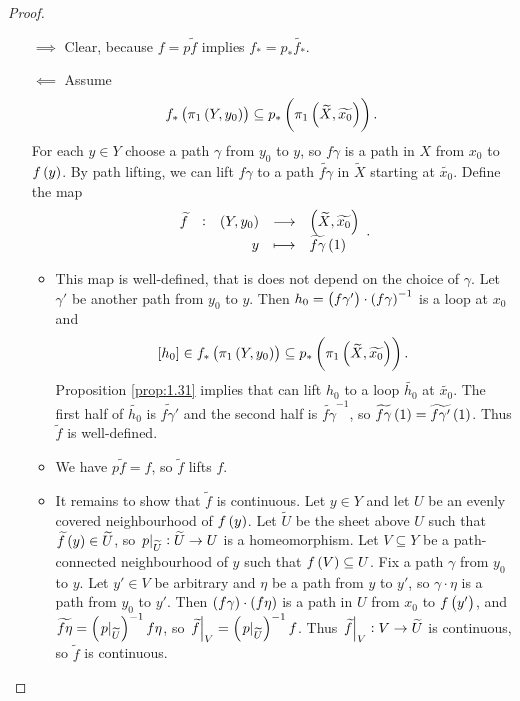 \begin{proof}
\hfill
\begin{itemize}
\item[$ \implies $] Clear, because $ f = p\widetilde{f} $ implies $ f_* = p_*\widetilde{f_*} $.
\item[$ \impliedby $] Assume
$$ f_*\br{\pi_1\br{Y, y_0}} \subseteq p_*\br{\pi_1\br{\widetilde{X}, \widetilde{x_0}}}. $$
For each $ y \in Y $ choose a path $ \gamma $ from $ y_0 $ to $ y $, so $ f\gamma $ is a path in $ X $ from $ x_0 $ to $ f\br{y} $. By path lifting, we can lift $ f\gamma $ to a path $ \widetilde{f\gamma} $ in $ \widetilde{X} $ starting at $ \widetilde{x_0} $. Define the map
$$ \function[\widetilde{f}]{\br{Y, y_0}}{\br{\widetilde{X}, \widetilde{x_0}}}{y}{\widetilde{f\gamma}\br{1}}. $$
\begin{itemize}
\item This map is well-defined, that is does not depend on the choice of $ \gamma $. Let $ \gamma' $ be another path from $ y_0 $ to $ y $. Then $ h_0 = \br{f\gamma'} \cdot \br{f\gamma}^{-1} $ is a loop at $ x_0 $ and
$$ \sbr{h_0} \in f_*\br{\pi_1\br{Y, y_0}} \subseteq p_*\br{\pi_1\br{\widetilde{X}, \widetilde{x_0}}}. $$
Proposition \ref{prop:1.31} implies that can lift $ h_0 $ to a loop $ \widetilde{h_0} $ at $ \widetilde{x_0} $. The first half of $ \widetilde{h_0} $ is $ \widetilde{f\gamma'} $ and the second half is $ \widetilde{f\gamma}^{-1} $, so $ \widetilde{f\gamma}\br{1} = \widetilde{f\gamma'}\br{1} $. Thus $ \widetilde{f} $ is well-defined.
\item We have $ p\widetilde{f} = f $, so $ \widetilde{f} $ lifts $ f $.
\item It remains to show that $ \widetilde{f} $ is continuous. Let $ y \in Y $ and let $ U $ be an evenly covered neighbourhood of $ f\br{y} $. Let $ \widetilde{U} $ be the sheet above $ U $ such that $ \widetilde{f}\br{y} \in \widetilde{U} $, so $ \left. p \right|_{\widetilde{U}} : \widetilde{U} \to U $ is a homeomorphism. Let $ V \subseteq Y $ be a path-connected neighbourhood of $ y $ such that $ f\br{V} \subseteq U $. Fix a path $ \gamma $ from $ y_0 $ to $ y $. Let $ y' \in V $ be arbitrary and $ \eta $ be a path from $ y $ to $ y' $, so $ \gamma \cdot \eta $ is a path from $ y_0 $ to $ y' $. Then $ \br{f\gamma} \cdot \br{f\eta} $ is a path in $ U $ from $ x_0 $ to $ f\br{y'} $, and $ \widetilde{f\eta} = \br{\eval{p}_{\widetilde{U}}}^{-1}f\eta $, so $ \eval{\widetilde{f}}_V = \br{\eval{p}_{\widetilde{U}}}^{-1}f $. Thus $ \left. \widetilde{f} \right|_V : V \to \widetilde{U} $ is continuous, so $ \widetilde{f} $ is continuous.
\end{itemize}
\end{itemize}
\end{proof}

